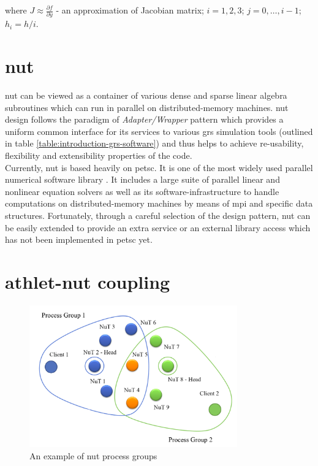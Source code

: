where $J \approx \frac{\partial f}{\partial y}$ - an approximation of Jacobian matrix; $i = 1, 2, 3$; $j=0, \dots, i - 1$; $h_{i} = h / i$.



\section{\acrshort{nut}}

\acrfull{nut} can be viewed as a container of various dense and sparse linear algebra subroutines which can run in parallel on distributed-memory machines. \acrshort{nut} design follows the paradigm of \textit{Adapter/Wrapper} pattern which provides a uniform common interface for its services to various \acrshort{grs} simulation tools (outlined in table \ref{table:introduction-grs-software}) and thus helps to achieve re-usability, flexibility and extensibility properties of the code.\\


Currently, \acrshort{nut} is based heavily on \acrfull{petsc}. It is one of the most widely used parallel numerical software  library \cite{wiki:petsc-general-info}. It includes a large suite of parallel linear and nonlinear equation solvers as well as its software-infrastructure to handle computations on distributed-memory machines by means of \acrfull{mpi} and specific data structures. Fortunately, through a careful selection of the design pattern, \acrshort{nut} can be easily extended to provide an extra service or an external library access which has not been implemented in \acrshort{petsc} yet.\\ 


\section{\acrshort{athlet}-\acrshort{nut} coupling}
\label{sec:athlet-nut-coupling}

\figpointer{\ref{fig:introduction-nut-process-groups}}
\begin{figure}[htpb]
  \centering
  \includegraphics[width=0.8\textwidth]{figures/introduction-nut-process-groups.png}
\caption{An example of \acrshort{nut} process groups}
\label{fig:introduction-nut-process-groups}
\end{figure}

